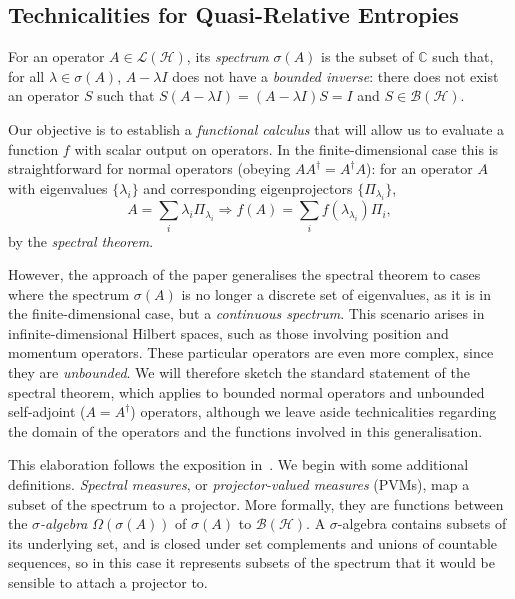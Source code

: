 \documentclass[10pt, a4paper]{article}
\numberwithin{equation}{section} %
\theoremstyle{definition}
\theoremstyle{plain}
\newcommand{\?}{\mathrel{?}} %
\newcommand{\C}{\mathbb{C}} %
\newcommand{\Hs}{\mathcal{H}} %
\begin{document}
    \begin{appendices}
      \section{Technicalities for Quasi-Relative Entropies}\label{sec:qretech}

      For an operator \(A \in \mathcal{L}(\Hs)\), its \emph{spectrum} \(\sigma(A)\) is the subset of \(\C\) such that, for all \(\lambda \in \sigma(A)\), \(A - \lambda I\) does not have a \emph{bounded inverse}: there does not exist an operator \(S\) such that \(S\left( A - \lambda I \right) = \left( A - \lambda I \right)S =  I\) and \(S \in \mathcal{B}(\Hs)\).

      Our objective is to establish a \emph{functional calculus} that will allow us to evaluate a function  \(f\) with scalar output on operators. In the finite-dimensional case this is straightforward for normal operators (obeying \(AA^{\dagger} = A^{\dagger}A\)): for an operator \(A\) with eigenvalues \(\{\lambda_i\}\) and corresponding eigenprojectors \(\{\Pi_{\lambda_i}\}\),
      \[ A = \sum_i \lambda_i \Pi_{\lambda_i} \Rightarrow f(A) = \sum_i f(\lambda_{\lambda_i}) \Pi_i, \]
      by the \emph{spectral theorem}.

      However, the approach of the paper generalises the spectral theorem to cases where the spectrum \(\sigma(A)\) is no longer a discrete set of eigenvalues, as it is in the finite-dimensional case, but a \emph{continuous spectrum}. This scenario arises in infinite-dimensional Hilbert spaces, such as those involving position and momentum operators. These particular operators are even more complex, since they are \emph{unbounded}. We will therefore sketch the standard statement of the spectral theorem, which applies to bounded normal operators and unbounded self-adjoint (\(A = A^{\dagger}\)) operators, although we leave aside technicalities regarding the domain of the operators and the functions involved in this generalisation.

      This elaboration follows the exposition in~\cite{HallQuantumForMath}. We begin with some additional definitions. \emph{Spectral measures}, or \emph{projector-valued measures} (PVMs), map a subset of the spectrum to a projector. More formally, they are functions between the \emph{\(\sigma\)-algebra} \(\Omega(\sigma(A))\) of \(\sigma(A)\) to \(\mathcal{B}(\Hs)\). A \(\sigma\)-algebra contains subsets of its underlying set, and is closed under set complements and unions of countable sequences, so in this case it represents subsets of the spectrum that it would be sensible to attach a projector to.


\end{appendices}
\end{document}
